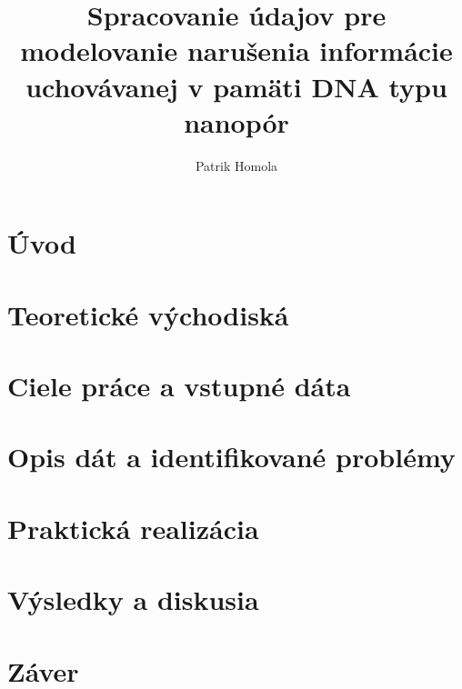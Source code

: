 \documentclass[12pt]{article}
\title{Spracovanie údajov pre modelovanie narušenia informácie uchovávanej v pamäti DNA typu nanopór}
\author{Patrik Homola}
\begin{document}








\tableofcontents
\pagebreak
\listoffigures
\pagebreak
\lstlistoflistings
\pagebreak

\glsaddall
{}
\printglossary[type=\acronymtype,title={Zoznam skratiek a značiek}]


\section{Úvod}


\section{Teoretické východiská}


\section{Ciele práce a vstupné dáta}


\section{Opis dát a identifikované problémy}


\section{Praktická realizácia}


\section{Výsledky a diskusia}


\section{Záver}


\newpage
\printbibliography[title={Použitá literatúra}]
\end{document}
